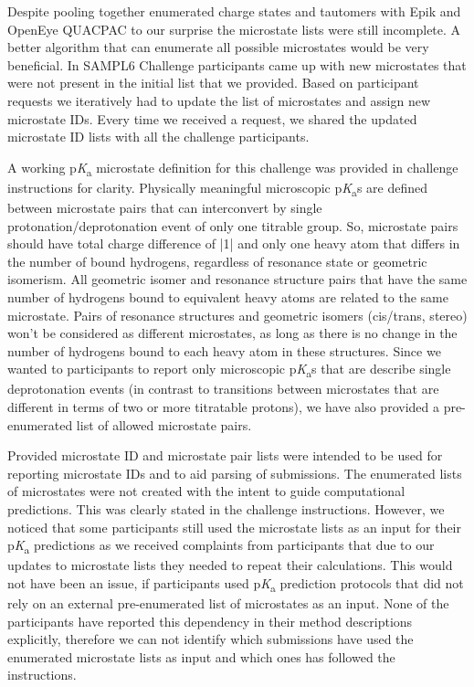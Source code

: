\documentclass[9pt,lineno,final]{elife}
\newcommand{\pKa}{p\textit{K}\textsubscript{a}}
\begin{document}
Despite pooling together enumerated charge states and tautomers with Epik and OpenEye QUACPAC to our surprise the microstate lists were still incomplete.
A better algorithm that can enumerate all possible microstates would be very beneficial. 
In SAMPL6 Challenge participants came up with new microstates that were not present in the initial list that we provided. 
Based on participant requests we iteratively had to update the list of microstates and assign new microstate IDs.
Every time we received a request, we shared the updated microstate ID lists with all the challenge participants.

A working \pKa{} microstate definition for this challenge was provided in challenge instructions for clarity. 
Physically meaningful microscopic \pKa{}s are defined between microstate pairs that can interconvert by single protonation/deprotonation event of only one titrable group. 
So, microstate pairs should have total charge difference of |1| and only one heavy atom that differs in the number of bound hydrogens, regardless of resonance state or geometric isomerism. 
All geometric isomer and resonance structure pairs that have the same number of hydrogens bound to equivalent heavy atoms are related to the same microstate. 
Pairs of resonance structures and geometric isomers (cis/trans, stereo) won't be considered as different microstates, as long as there is no change in the number of hydrogens bound to each heavy atom in these structures.
Since we wanted to participants to report only microscopic \pKa{}s that are describe single deprotonation events (in contrast to transitions between microstates that are different in terms of two or more titratable protons), we have also provided a pre-enumerated list of allowed microstate pairs.

Provided microstate ID and microstate pair lists were intended to be used for reporting microstate IDs and to aid parsing of submissions. 
The enumerated lists of microstates were not created with the intent to guide computational predictions. 
This was clearly stated in the challenge instructions. 
However, we noticed that some participants still used the microstate lists as an input for their \pKa{} predictions as we received complaints from participants that due to our updates to microstate lists they needed to repeat their calculations. 
This would not have been an issue, if participants used \pKa{} prediction protocols that did not rely on an external pre-enumerated list of microstates as an input.
None of the participants have reported this dependency in their method descriptions explicitly, therefore we can not identify which submissions have used the enumerated microstate lists as input and which ones has followed the instructions.
\end{document}
